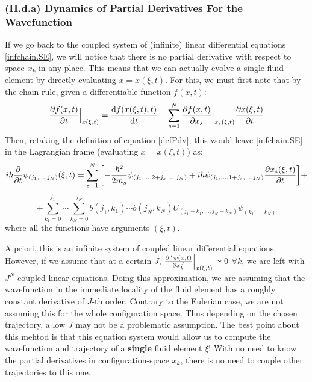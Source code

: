 \documentclass[11pt, a4paper]{article} %
\begin{document}
\subsubsection*{(II.d.a) Dynamics of Partial Derivatives For the Wavefunction}\vspace{-0.1cm}

If we go back to the coupled system of (infinite) linear differential equations \eqref{infchain.SE}, we will notice that there is no partial derivative with respect to space $x_k$ in any place. This means that we can actually evolve a single fluid element by directly evaluating $x=x(\xi,t)$. For this, we must first note that by the chain rule, given a differentiable function $f(x,t)$:
\begin{equation}\label{ruler}
\pdv{f(x,t)}{t}\Big\rvert_{x(\xi,t)} = \dv{f(x(\xi,t),t)}{t}-\sum_{s=1}^N \pdv{f(x,t)}{x_s}\Big\rvert_{x_s(\xi,t)}\pdv{x(\xi,t)}{t}
\end{equation}
Then, retaking the definition of equation \eqref{defPdv}, this would leave \eqref{infchain.SE} in the Lagrangian frame (evaluating $x=x(\xi,t)$) as:\vspace{-0.1cm}
\begin{equation}\label{infchain.SE.L}
i\hbar \pdv{}{t}\psi_{(j_1,...,j_N)}(\xi,t)=\sum_{s=1}^N\qty[-\frac{\hbar^2}{2m_s}\psi_{(j_1,...,2+j_s,...,j_N)}+i\hbar \psi_{(j_1,...,1+j_s,...,j_N)} \pdv{x_s(\xi,t)}{t}]+\vspace{-0.1cm}
\end{equation}
$$
+\sum_{k_1=0}^{j_1}\cdots\sum_{k_N=0}^{j_N} b(j_1,k_1)\cdots b(j_N,k_N)U_{(j_1-k_1,...,j_N-k_N)}\psi_{(k_1,...,k_N)}
$$
where all the functions have arguments $(\xi,t)$.

A priori, this is an infinite system of coupled linear differential equations. However, if we assume that at a certain $J$, $\pdv[J]{\psi(x,t)}{x_k}\Big\rvert_{x(\xi,t)}\simeq 0$  $\forall k$, we are left with $J^N$ coupled linear equations. Doing this approximation, we are assuming that the wavefunction in the immediate locality of the fluid element has a roughly constant derivative of $J$-th order. Contrary to the Eulerian case, we are not assuming this for the whole configuration space. Thus depending on the chosen trajectory, a low $J$ may not be a problematic assumption. The best point about this mehtod is that this equation system would allow us to compute the wavefunction and trajectory of a {\bf single} fluid element $\xi$! With no need to know the partial derivatives in configuration-space $x_k$, there is no need to couple other trajectories to this one.
\end{document}
